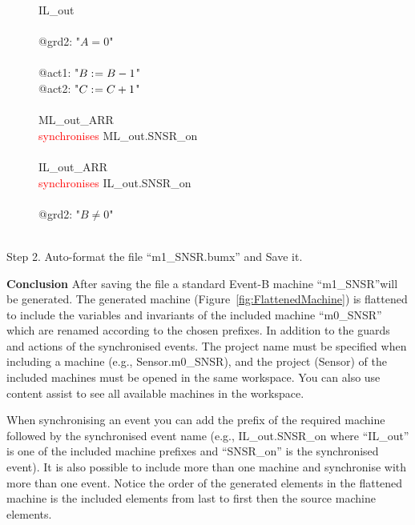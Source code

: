 \begin{description}
\begin{center}
\begin{Bcode}
			\Btab \Brefines{} IL_out\\
			\Btab \Bwhen\\
			\Btab \Btab @grd2: "\(A = 0\)"\\
			\Btab \Bthen\\
			\Btab \Btab @act1: "\(B \mathrel{:\mkern1mu=} B - 1\)"\\
			\Btab \Btab @act2: "\(C \mathrel{:\mkern1mu=} C + 1\)"\\
			\Btab \Bend\\
			\Btab ML_out_ARR\\
			\Btab \textcolor{red}{synchronises} ML_out.SNSR_on\\
			\Btab \Bend\\
			\Btab IL_out_ARR\\
			\Btab \textcolor{red}{synchronises} IL_out.SNSR_on\\
			\Btab \Bwhen\\
			\Btab \Btab @grd2: "\(B \neq 0\)"\\
			\Btab \Bend\\
			\Bend
			\fi
		\end{Bcode}
	\end{center}
	\item[Step 2. Auto-format the file ``m1\_SNSR.bumx'' and Save it.]
\end{description}
\textbf{Conclusion} After saving the file a standard Event-B machine ``m1\_SNSR''will be generated. The generated machine (Figure~\ref{fig:FlattenedMachine}) is flattened to include the variables and invariants  of the included machine ``m0\_SNSR'' which are renamed according to the chosen prefixes. In addition to the guards and actions of the synchronised events. The project name must be specified when including a machine (e.g., Sensor.m0\_SNSR), and the project (Sensor) of the included machines must be opened in the same workspace. You can also use content assist to see all available machines in the workspace.

When synchronising an event you can add the prefix of the required machine followed by the synchronised event name (e.g., IL\_out.SNSR\_on where ``IL\_out'' is one of the included machine prefixes and ``SNSR\_on'' is the synchronised event). It is also possible to include more than one machine and synchronise with more than one event. Notice the order of the generated elements in the flattened machine is the included elements from last to first then the source machine elements.

